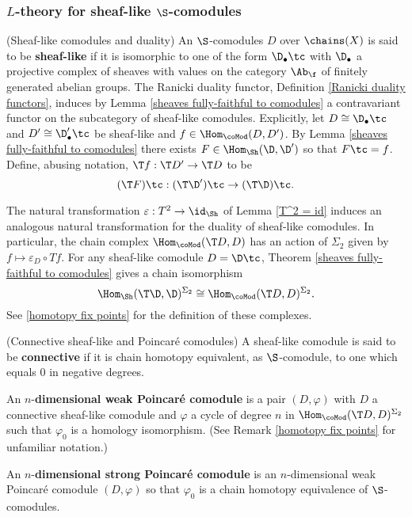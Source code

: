 \subsubsection{$L$-theory for sheaf-like $\S$-comodules}

\begin{definition}(Sheaf-like comodules and duality) An $\S$-comodules $D$ over $\chains(X)$ is said to be \textbf{sheaf-like} if it is isomorphic to one of the form $\D_\bullet\tc$ with $\D_\bullet$ a projective complex of sheaves with values on the category $\Ab_{\f}$ of finitely generated abelian groups. The Ranicki duality functor, Definition \ref{Ranicki duality functors}, induces by Lemma \ref{sheaves fully-faithful to comodules} a contravariant functor on the subcategory of sheaf-like comodules. Explicitly, let $D\cong\D_\bullet\tc$ and $D'\cong\D'_\bullet\tc$ be sheaf-like and $f\in\Hom_{\coMod}(D,D')$. By Lemma \ref{sheaves fully-faithful to comodules} there exists $F\in\Hom_{\Sh}(\D,\D')$ so that $F\tc=f$. Define, abusing notation, $\T f:\T D'\to\T D$ to be $$(\T F)\tc:(\T\D')\tc\to(\T\D)\tc.$$
\end{definition}

\begin{remark} \label{duality for comodules}
The natural transformation $\varepsilon:T^2\to\id_{\Sh}$ of Lemma \ref{T^2 = id} induces an analogous natural transformation for the duality of sheaf-like comodules. In particular, the chain complex $\Hom_{\coMod}(\T D,D)$ has an action of $\Sigma_2$ given by $f\mapsto \varepsilon_{D}\circ Tf$. For any sheaf-like comodule $D=\D\tc$, Theorem \ref{sheaves fully-faithful to comodules} gives a chain isomorphism $$\Hom_{\Sh}(\T\D,\D)^{\Sigma_2}\cong\Hom_{\coMod}(\T D,D)^{\Sigma_2}.$$
See \ref{homotopy fix points} for the definition of these complexes.
\end{remark}

\begin{definition}(Connective sheaf-like and Poincar\'e comodules)
A sheaf-like comodule is said to be \textbf{connective} if it is chain homotopy equivalent, as $\S$-comodule, to one which equals $0$ in negative degrees.

An $n$-\textbf{dimensional weak Poincar\'e comodule} is a pair $(D,\varphi)$ with $D$ a connective sheaf-like comodule and $\varphi$ a cycle of degree $n$ in $\Hom_{\coMod}(\T D,D)^{\Sigma_2}$ such that $\varphi_0$ is a homology isomorphism. (See Remark \ref{homotopy fix points} for unfamiliar notation.)

An $n$-\textbf{dimensional strong Poincar\'e comodule} is an $n$-dimensional weak Poincar\'e comodule $(D,\varphi)$ so that $\varphi_0$ is a chain homotopy equivalence of $\S$-comodules.
\end{definition}

